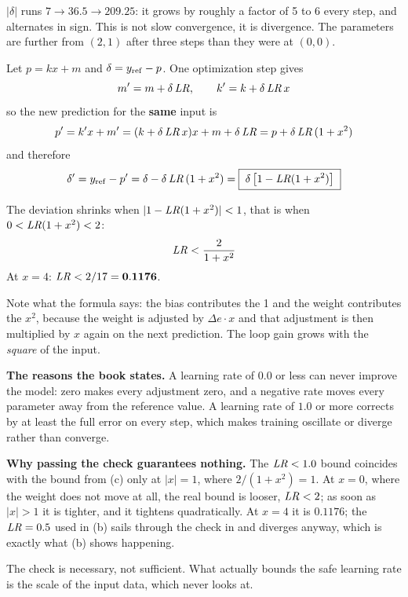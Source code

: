 $\lvert\delta\rvert$ runs $7 \rightarrow 36.5 \rightarrow 209.25$: it grows by roughly a factor of
5 to 6 every step, and alternates in sign. This is not slow convergence, it is divergence. The
parameters are further from $(2, 1)$ after three steps than they were at $(0, 0)$.

Let $p = kx + m$ and $\delta = y_{\mathrm{ref}} - p$. One optimization step gives
\[
  m' = m + \delta\,\mathit{LR}, \qquad k' = k + \delta\,\mathit{LR}\,x
\]
so the new prediction for the \textbf{same} input is
\[
  p' = k'x + m' = (k + \delta\,\mathit{LR}\,x)x + m + \delta\,\mathit{LR} = p + \delta\,\mathit{LR}\,(1 + x^2)
\]
and therefore
\[
  \delta' = y_{\mathrm{ref}} - p' = \delta - \delta\,\mathit{LR}\,(1 + x^2)
    = \boxed{\;\delta\left[1 - \mathit{LR}(1 + x^2)\right]\;}
\]

The deviation shrinks when $\lvert 1 - \mathit{LR}(1+x^2)\rvert < 1$, that is when
$0 < \mathit{LR}(1+x^2) < 2$:
\[
  \mathit{LR} < \frac{2}{1 + x^2}
\]
At $x = 4$: $\mathit{LR} < 2/17 = \mathbf{0.1176}$. 

Note what the formula says: the bias contributes the 1 and the weight contributes the $x^2$,
because the weight is adjusted by $\Delta e \cdot x$ and that adjustment is then multiplied by $x$
again on the next prediction. The loop gain grows with the \emph{square} of the input.

\textbf{The reasons the book states.} A learning rate of $0.0$ or less can never improve the model:
zero makes every adjustment zero, and a negative rate moves every parameter away from the reference
value. A learning rate of $1.0$ or more corrects by at least the full error on every step, which
makes training oscillate or diverge rather than converge. 

\textbf{Why passing the check guarantees nothing.} The $\mathit{LR} < 1.0$ bound coincides with the bound
from (c) only at $\lvert x \rvert = 1$, where $2/(1+x^2) = 1$. At $x = 0$, where the weight does not
move at all, the real bound is looser, $\mathit{LR} < 2$; as soon as $\lvert x \rvert > 1$ it is tighter,
and it tightens quadratically. At $x = 4$ it is $0.1176$; the $\mathit{LR} = 0.5$ used in (b) sails through
the check in  and diverges anyway, which is exactly what (b) shows happening.

The check is necessary, not sufficient. What actually bounds the safe learning rate is the scale of
the input data, which  never looks at. 



